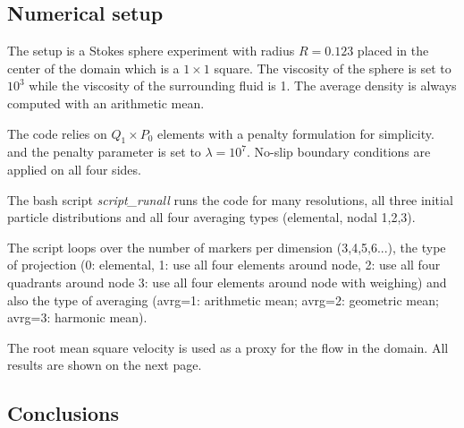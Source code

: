 \subsection*{Numerical setup}

The setup is a Stokes sphere experiment with radius $R=0.123$ placed in the center 
of the domain which is a $1\times 1$ square. 
The viscosity of the sphere is set to $10^3$ while the viscosity of the 
surrounding fluid is 1. The average density is always computed with an arithmetic mean. 

The code relies on $Q_1 \times P_0$ elements with a penalty formulation for simplicity.
and the penalty parameter is set to $\lambda=10^7$.
No-slip boundary conditions are applied on all four sides.

The bash script {\sl script\_runall} 
runs the code for many resolutions, all three initial particle distributions and all four 
averaging types (elemental, nodal 1,2,3). 

The script loops over the number of markers per dimension (3,4,5,6...), 
the type of projection
(0: elemental, 1: use all four elements around node, 2: use all four quadrants around node
3: use all four elements around node with weighing) and also the type of averaging 
(avrg=1: arithmetic mean; avrg=2: geometric mean; avrg=3: harmonic mean).

The root mean square velocity is used as a proxy for the flow in the domain. 
All results are shown on the next page. 

\subsection*{Conclusions}

